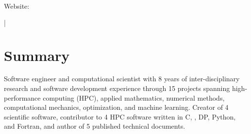 \documentclass[letterpaper,10pt]{article}
\begin{document}
{\scshape\huge\Author}\vspace{2pt}

\begin{small}
  Website: \href{\AuthorWebsiteLink}{\AuthorWebsiteText}

  \vspace{2pt}\AuthorAddress

  \vspace{1pt}\href{mailto:\AuthorEmail}{\AuthorEmail} |
  \href{\AuthorPhoneLink}{\AuthorPhoneText}
\end{small}

\section{Summary}
Software engineer and computational scientist with 8 years of
inter-disciplinary research and software development experience through
15\smallplus{} projects spanning high-performance computing (HPC), applied
mathematics, numerical methods, computational mechanics, optimization, and
machine learning. Creator of 4 scientific software, contributor to 4 HPC
software written in C, \CC{}, DP\CC{}, Python, and Fortran, and author of 5
published technical documents.

\vspace{-182.8pt}
\end{document}
